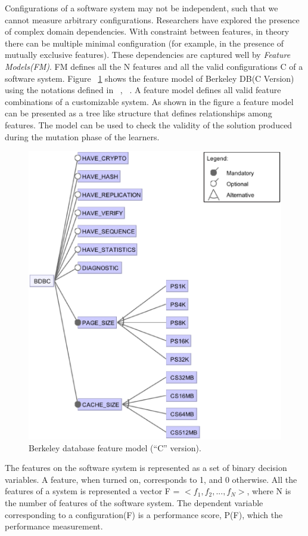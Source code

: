 \documentclass{sig-alternative}
\begin{document}
    Configurations of a software system may not be independent, such that we cannot measure arbitrary configurations. Researchers have explored the presence of complex domain dependencies. With constraint between features, in theory there can be multiple minimal configuration (for example, in the presence of mutually exclusive features). These dependencies are captured well by \textit{Feature Models(FM)}. FM defines all the N features and all the valid configurations C of a software system. Figure ~\ref{fig:bdbc}  shows the feature model of Berkeley DB(C Version) using the notations defined in ~\cite{kang1990feature}, ~\cite{guo2012consistency}. A feature model defines all valid feature combinations of a customizable system. As shown in the figure a feature model can be presented as a tree like structure that defines relationships among features. The model can be used to check the validity of the solution produced during the mutation phase of the learners.
    
\begin{figure}[!t]
\includegraphics[width=0.9\linewidth]{Figures/BDBC.eps}
\caption{ Berkeley database feature model   (``C'' version). }\label{fig:bdbc}
\end{figure}
    
    The features on the software system is represented as a set of binary decision variables. A feature, when turned on, corresponds to 1, and 0 otherwise. All the features of a system is represented a vector F = $<f_1, f_2, ...,f_N>$, where N is the number of features of the software system. The dependent variable corresponding to a configuration(F) is a performance score, P(F), which the performance measurement.
\end{document}
